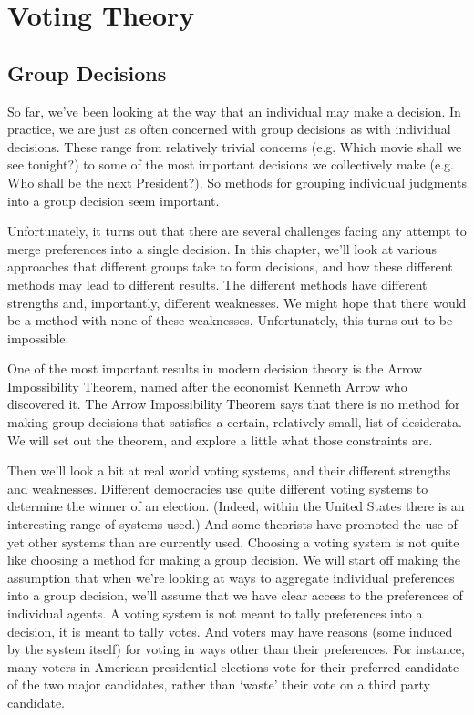 \documentclass[openany]{book}
\begin{document}
\part{Voting Theory}

\chapter{Group Decisions}

So far, we've been looking at the way that an individual may make a decision. In practice, we are just as often concerned with group decisions as with individual decisions. These range from relatively trivial concerns (e.g. Which movie shall we see tonight?) to some of the most important decisions we collectively make (e.g. Who shall be the next President?). So methods for grouping individual judgments into a group decision seem important.

Unfortunately, it turns out that there are several challenges facing any attempt to merge preferences into a single decision. In this chapter, we'll look at various approaches that different groups take to form decisions, and how these different methods may lead to different results. The different methods have different strengths and, importantly, different weaknesses. We might hope that there would be a method with none of these weaknesses. Unfortunately, this turns out to be impossible. 

One of the most important results in modern decision theory is the Arrow Impossibility Theorem, named after the economist Kenneth Arrow who discovered it. The Arrow Impossibility Theorem says that there is no method for making group decisions that satisfies a certain, relatively small, list of desiderata. We will set out the theorem, and explore a little what those constraints are.

Then we'll look a bit at real world voting systems, and their different strengths and weaknesses. Different democracies use quite different voting systems to determine the winner of an election. (Indeed, within the United States there is an interesting range of systems used.) And some theorists have promoted the use of yet other systems than are currently used. Choosing a voting system is not quite like choosing a method for making a group decision. We will start off making the assumption that when we're looking at ways to aggregate individual preferences into a group decision, we'll assume that we have clear access to the preferences of individual agents. A voting system is not meant to tally preferences into a decision, it is meant to tally votes. And voters may have reasons (some induced by the system itself) for voting in ways other than their preferences. For instance, many voters in American presidential elections vote for their preferred candidate of the two major candidates, rather than `waste' their vote on a third party candidate.
\end{document}
